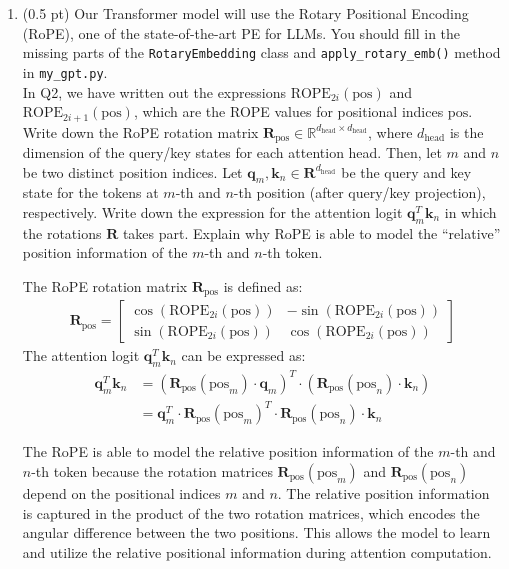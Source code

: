\begin{enumerate}
\item (0.5 pt)
Our Transformer model will use the Rotary Positional Encoding (RoPE), one of the state-of-the-art PE for LLMs. You should fill in the missing parts of the \texttt{RotaryEmbedding} class and \texttt{apply\_rotary\_emb()} method in \texttt{my\_gpt.py}. \\
In Q2, we have written out the expressions $\text{ROPE}_{2i}(\text{pos})$ and $\text{ROPE}_{2i + 1}(\text{pos})$, which are the ROPE values for positional indices $\text{pos}$.
 Write down the RoPE rotation matrix $\mathbf{R}_{\text{pos}} \in \mathbb{R}^{d_{\text{head}} \times d_{\text{head}}}$, where $d_{\text{head}}$ is the dimension of the query/key states for each attention head. Then, let $m$ and $n$ be two distinct position indices. Let $\mathbf{q}_m, \mathbf{k}_n \in \mathbf{R}^{d_{\text{head}}}$ be the query and key state for the tokens at $m$-th and $n$-th position (after query/key projection), respectively. Write down the expression for the attention logit $\mathbf{q}_m^T \mathbf{k}_n$ in which the rotations $\mathbf{R}$ takes part. Explain why RoPE is able to model the ``relative'' position information of the $m$-th and $n$-th token.

\begin{answerbox}[2.8in]
 The RoPE rotation matrix $\mathbf{R}_{\text{pos}}$ is defined as:
\begin{align*}
    \mathbf{R}_{\text{pos}} = \begin{bmatrix}
        \cos(\text{ROPE}_{2i}(\text{pos})) & -\sin(\text{ROPE}_{2i}(\text{pos})) \\
        \sin(\text{ROPE}_{2i}(\text{pos})) & \cos(\text{ROPE}_{2i}(\text{pos}))
    \end{bmatrix}
\end{align*}
The attention logit $\mathbf{q}_m^T \mathbf{k}_n$ can be expressed as:
\begin{align*}
    \mathbf{q}_m^T \mathbf{k}_n &= \left(\mathbf{R}_{\text{pos}}(\text{pos}_m) \cdot \mathbf{q}_m\right)^T \cdot \left(\mathbf{R}_{\text{pos}}(\text{pos}_n) \cdot \mathbf{k}_n\right) \\
    &= \mathbf{q}_m^T \cdot \mathbf{R}_{\text{pos}}(\text{pos}_m)^T \cdot \mathbf{R}_{\text{pos}}(\text{pos}_n) \cdot \mathbf{k}_n
\end{align*}

The RoPE is able to model the relative position information of the $m$-th and
$n$-th token because the rotation matrices
$\mathbf{R}_{\text{pos}}(\text{pos}_m)$ and
$\mathbf{R}_{\text{pos}}(\text{pos}_n)$ depend on the positional indices $m$ and
$n$. The relative position information is captured in the product of the two
rotation matrices, which encodes the angular difference between the two
positions. This allows the model to learn and utilize the relative positional
information during attention computation.


\end{answerbox}
\end{enumerate}
